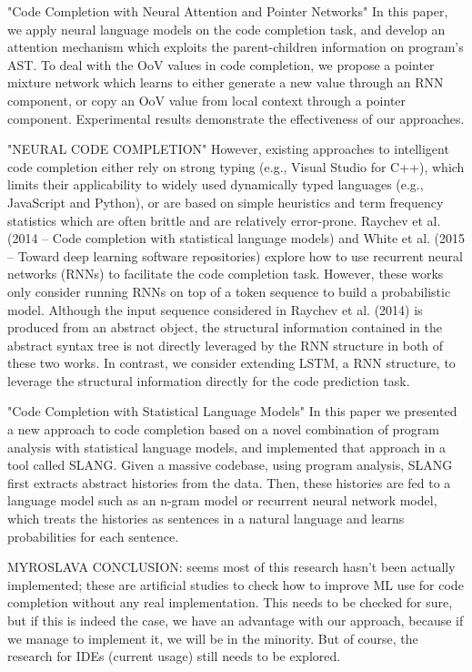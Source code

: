 "Code Completion with Neural Attention and Pointer Networks"
In this paper, we apply neural language models on the code completion task, and
develop an attention mechanism which exploits the parent-children information on
program’s AST. To deal with the OoV values in code completion, we propose a pointer
mixture network which learns to either generate a new value through an RNN component,
or copy an OoV value from local context through a pointer component. Experimental
results demonstrate the effectiveness of our approaches.

"NEURAL CODE COMPLETION"
However, existing approaches to intelligent code completion either rely on strong typing
(e.g., Visual Studio for C++), which limits their applicability to widely used dynamically
typed languages (e.g., JavaScript and Python), or are based on simple heuristics and term
frequency statistics which are often brittle and are relatively error-prone.
Raychev et al. (2014 -- Code completion with statistical language models) and White et al.
(2015 -- Toward deep learning software repositories) explore how to use recurrent neural networks
(RNNs) to facilitate the code completion task. However, these works only consider running
RNNs on top of a token sequence to build a probabilistic model. Although the input sequence
considered in Raychev et al. (2014) is produced from an abstract object, the structural
information contained in the abstract syntax tree is not directly leveraged by the RNN structure
in both of these two works. In contrast, we consider extending LSTM, a RNN structure,
to leverage the structural information directly for the code prediction task.

"Code Completion with Statistical Language Models"
In this paper we presented a new approach to code completion based on a novel combination
of program analysis with statistical language models, and implemented that approach in a tool
called SLANG. Given a massive codebase, using program analysis, SLANG ﬁrst extracts abstract
histories from the data. Then, these histories are fed to a language model such as an n-gram
model or recurrent neural network model, which treats the histories as sentences in a natural
language and learns probabilities for each sentence.

MYROSLAVA CONCLUSION: seems most of this research hasn't been actually implemented; these are artificial
studies to check how to improve ML use for code completion without any real implementation.
This needs to be checked for sure, but if this is indeed the case, we have an advantage with our
approach, because if we manage to implement it, we will be in the minority. But of course, the
research for IDEs (current usage) still needs to be explored.

